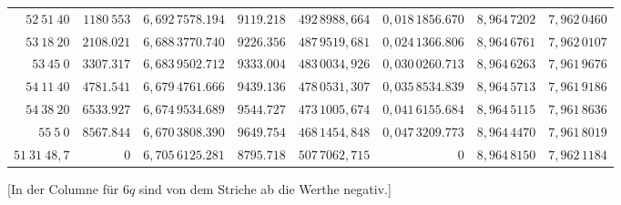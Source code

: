 \begin{center}
\begin{tabular}{|r|r|r|r|r|r|r|r|}
$52\ 51\ 40$&$1180\ 553$&$6{,}692\,7578.194$&$9119.218$&$492\,8988{,}664$&$0{,}018\,1856.670$&$8{,}964\,7202$&$7{,}962\,0460$\\
$53\ 18\ 20$&$2108.021$&$6{,}688\,3770.740$&$9226.356$&$487\,9519{,}681$&$0{,}024\,1366.806$&$8{,}964\,6761$&$7{,}962\,0107$\\
$53\ 45\ 0$&$3307.317$&$6{,}683\,9502.712$&$9333.004$&$483\,0034{,}926$&$0{,}030\,0260.713$&$8{,}964\,6263$&$7{,}961\,9676$\\
$54\ 11\ 40$&$4781.541$&$6{,}679\,4761.666$&$9439.136$&$478\,0531{,}307$&$0{,}035\,8534.839$&$8{,}964\,5713$&$7{,}961\,9186$\\
$54\ 38\ 20$&$6533.927$&$6{,}674\,9534.689$&$9544.727$&$473\,1005{,}674$&$0{,}041\,6155.684$&$8{,}964\,5115$&$7{,}961\,8636$\\
$55\ 5\ 0$&$8567.844$&$6{,}670\,3808.390$&$9649.754$&$468\,1454{,}848$&$0{,}047\,3209.773$&$8{,}964\,4470$&$7{,}961\,8019$\\[8pt]
$51\ 31\ 48{,}7$&$0$&$6{,}705\,6125.281$&$8795.718$&$507\,7062{,}715$&$0$&$8{,}964\,8150$&$7{,}962\,1184$\\
\end{tabular}\par\endgroup
\end{center}
\noindent{}[In der Columne für $6q$ sind von dem Striche ab die Werthe negativ.]
\vspace{12mm}
